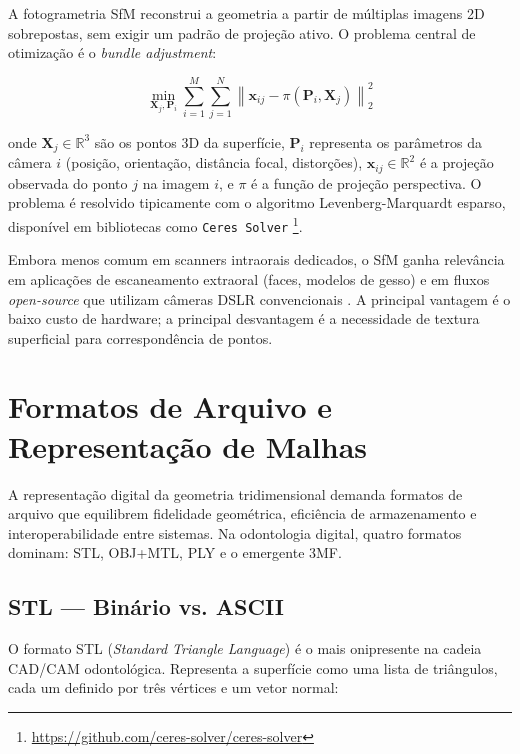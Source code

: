 A fotogrametria SfM reconstrui a geometria a partir de múltiplas imagens 2D sobrepostas, sem exigir um padrão de projeção ativo. O problema central de otimização é o \textit{bundle adjustment}:

\begin{equation}
\label{eq:bundle-adjustment}
\min_{\mathbf{X}_j, \mathbf{P}_i} \sum_{i=1}^{M} \sum_{j=1}^{N} \left\| \mathbf{x}_{ij} - \pi(\mathbf{P}_i, \mathbf{X}_j) \right\|_2^2
\end{equation}

onde $\mathbf{X}_j \in \mathbb{R}^3$ são os pontos 3D da superfície, $\mathbf{P}_i$ representa os parâmetros da câmera $i$ (posição, orientação, distância focal, distorções), $\mathbf{x}_{ij} \in \mathbb{R}^2$ é a projeção observada do ponto $j$ na imagem $i$, e $\pi$ é a função de projeção perspectiva. O problema é resolvido tipicamente com o algoritmo Levenberg-Marquardt esparso, disponível em bibliotecas como \texttt{Ceres Solver} \footnote{\url{https://github.com/ceres-solver/ceres-solver}}.

Embora menos comum em scanners intraorais dedicados, o SfM ganha relevância em aplicações de escaneamento extraoral (faces, modelos de gesso) e em fluxos \textit{open-source} que utilizam câmeras DSLR convencionais \cite{amini2022pointnet}. A principal vantagem é o baixo custo de hardware; a principal desvantagem é a necessidade de textura superficial para correspondência de pontos.

\section{Formatos de Arquivo e Representação de Malhas}
\label{sec:formatos-malha}

A representação digital da geometria tridimensional demanda formatos de arquivo que equilibrem fidelidade geométrica, eficiência de armazenamento e interoperabilidade entre sistemas. Na odontologia digital, quatro formatos dominam: STL, OBJ+MTL, PLY e o emergente 3MF.

\subsection{STL — Binário vs. ASCII}
\label{subsec:stl}

O formato STL (\textit{Standard Triangle Language}) é o mais onipresente na cadeia CAD/CAM odontológica. Representa a superfície como uma lista de triângulos, cada um definido por três vértices e um vetor normal:

